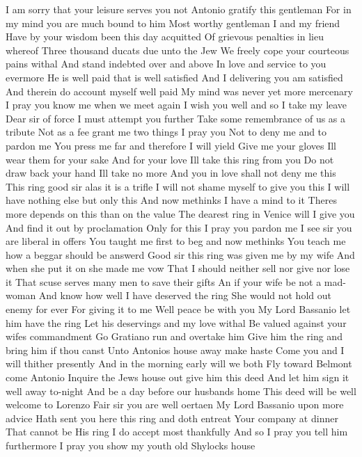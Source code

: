 I am sorry that your leisure serves you not 
Antonio gratify this gentleman 
For in my mind you are much bound to him 
Most worthy gentleman I and my friend 
Have by your wisdom been this day acquitted 
Of grievous penalties in lieu whereof 
Three thousand ducats due unto the Jew 
We freely cope your courteous pains withal 
And stand indebted over and above 
In love and service to you evermore 
He is well paid that is well satisfied 
And I delivering you am satisfied 
And therein do account myself well paid 
My mind was never yet more mercenary 
I pray you know me when we meet again 
I wish you well and so I take my leave 
Dear sir of force I must attempt you further 
Take some remembrance of us as a tribute 
Not as a fee grant me two things I pray you 
Not to deny me and to pardon me 
You press me far and therefore I will yield 
Give me your gloves Ill wear them for your sake 
And for your love Ill take this ring from you 
Do not draw back your hand Ill take no more 
And you in love shall not deny me this 
This ring good sir alas it is a trifle 
I will not shame myself to give you this 
I will have nothing else but only this 
And now methinks I have a mind to it 
Theres more depends on this than on the value 
The dearest ring in Venice will I give you 
And find it out by proclamation 
Only for this I pray you pardon me 
I see sir you are liberal in offers 
You taught me first to beg and now methinks 
You teach me how a beggar should be answerd 
Good sir this ring was given me by my wife 
And when she put it on she made me vow 
That I should neither sell nor give nor lose it 
That scuse serves many men to save their gifts 
An if your wife be not a mad-woman 
And know how well I have deserved the ring 
She would not hold out enemy for ever 
For giving it to me Well peace be with you 
My Lord Bassanio let him have the ring 
Let his deservings and my love withal 
Be valued against your wifes commandment 
Go Gratiano run and overtake him 
Give him the ring and bring him if thou canst 
Unto Antonios house away make haste 
Come you and I will thither presently 
And in the morning early will we both 
Fly toward Belmont come Antonio 
Inquire the Jews house out give him this deed 
And let him sign it well away to-night 
And be a day before our husbands home 
This deed will be well welcome to Lorenzo 
Fair sir you are well oertaen 
My Lord Bassanio upon more advice 
Hath sent you here this ring and doth entreat 
Your company at dinner 
That cannot be 
His ring I do accept most thankfully 
And so I pray you tell him furthermore 
I pray you show my youth old Shylocks house 
